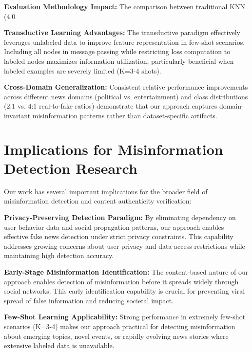 \textbf{Evaluation Methodology Impact:} The comparison between traditional KNN (4.0%

\textbf{Transductive Learning Advantages:} The transductive paradigm effectively leverages unlabeled data to improve feature representation in few-shot scenarios. Including all nodes in message passing while restricting loss computation to labeled nodes maximizes information utilization, particularly beneficial when labeled examples are severely limited (K=3-4 shots).

\textbf{Cross-Domain Generalization:} Consistent relative performance improvements across different news domains (political vs. entertainment) and class distributions (2:1 vs. 4:1 real-to-fake ratios) demonstrate that our approach captures domain-invariant misinformation patterns rather than dataset-specific artifacts.

\section{Implications for Misinformation Detection Research}

Our work has several important implications for the broader field of misinformation detection and content authenticity verification:

\textbf{Privacy-Preserving Detection Paradigm:} By eliminating dependency on user behavior data and social propagation patterns, our approach enables effective fake news detection under strict privacy constraints. This capability addresses growing concerns about user privacy and data access restrictions while maintaining high detection accuracy.

\textbf{Early-Stage Misinformation Identification:} The content-based nature of our approach enables detection of misinformation before it spreads widely through social networks. This early identification capability is crucial for preventing viral spread of false information and reducing societal impact.

\textbf{Few-Shot Learning Applicability:} Strong performance in extremely few-shot scenarios (K=3-4) makes our approach practical for detecting misinformation about emerging topics, novel events, or rapidly evolving news stories where extensive labeled data is unavailable.

